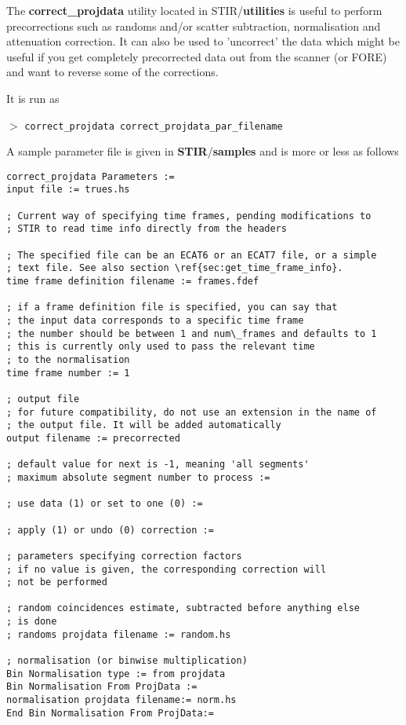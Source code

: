 \documentclass{article}
\newcommand{\cmdline}[1]{\par \noindent $>$ \texttt{#1}\par}
\begin{document}
{The \textbf{correct\_projdata} utility located in STIR/\textbf{utilities} 
is useful to perform precorrections such as randoms and/or scatter 
subtraction, normalisation and attenuation correction. It can 
also be used to 'uncorrect' the data which might be useful if 
you get completely precorrected data out from the scanner (or 
FORE) and want to reverse some of the corrections.


It is run as
\cmdline{correct\_projdata correct\_projdata\_par\_filename}


A sample parameter file is given in \textbf{STIR}/\textbf{samples} and 
is more or less as follows

\begin{verbatim}
correct_projdata Parameters := 
input file := trues.hs

; Current way of specifying time frames, pending modifications to
; STIR to read time info directly from the headers

; The specified file can be an ECAT6 or an ECAT7 file, or a simple
; text file. See also section \ref{sec:get_time_frame_info}. 
time frame definition filename := frames.fdef

; if a frame definition file is specified, you can say that 
; the input data corresponds to a specific time frame
; the number should be between 1 and num\_frames and defaults to 1
; this is currently only used to pass the relevant time 
; to the normalisation 
time frame number := 1

; output file
; for future compatibility, do not use an extension in the name of 
; the output file. It will be added automatically 
output filename := precorrected

; default value for next is -1, meaning 'all segments' 
; maximum absolute segment number to process :=  

; use data (1) or set to one (0) := 

; apply (1) or undo (0) correction := 

; parameters specifying correction factors 
; if no value is given, the corresponding correction will
; not be performed

; random coincidences estimate, subtracted before anything else 
; is done
; randoms projdata filename := random.hs 

; normalisation (or binwise multiplication) 
Bin Normalisation type := from projdata 
Bin Normalisation From ProjData := 
normalisation projdata filename:= norm.hs 
End Bin Normalisation From ProjData:=


\end{verbatim}}
\end{document}
